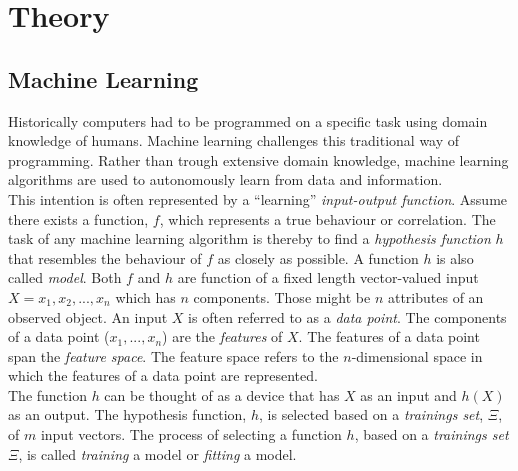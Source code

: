 \chapter{Theory}
\label{ch:Theory}
\section{Machine Learning}
Historically computers had to be programmed on a specific task using domain knowledge of humans. Machine learning challenges this traditional way of programming. Rather than trough extensive domain knowledge, machine learning algorithms are used to autonomously learn from data and information. \autocite{Marr.2016}
\\

This intention is often represented by a ``learning'' \emph{input-output function}. Assume there exists a function, $f$, which represents a true behaviour or correlation. The task of any machine learning algorithm is thereby to find a \emph{hypothesis function} $h$ that resembles the behaviour of $f$ as closely as possible. A function $h$ is also called \emph{model}. Both $f$ and $h$ are function of a fixed length vector-valued input $X={x_1, x_2, ... , x_n}$ which has $n$ components. Those might be $n$ attributes of an observed object. An input $X$ is often referred to as a \emph{data point}. The components of a data point ($x_1, ..., x_n$) are the \emph{features} of $X$. 
The features of a data point span the \emph{feature space}. The feature space refers to the $n$-dimensional space in which the features of a data point are represented.
\\
The function $h$ can be thought of as a device that has $X$ as an input and $h(X)$ as an output. The hypothesis function, $h$, is selected based on a \emph{trainings set}, $\Xi$, of $m$ input vectors. The process of selecting a function $h$, based on a \emph{trainings set} $\Xi$, is called \emph{training} a model or \emph{fitting} a model.
\\

